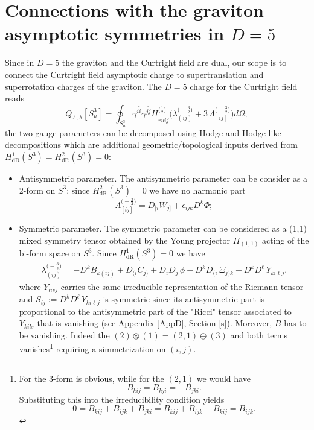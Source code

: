 \documentclass[a4paper,12pt]{article}
\begin{document}
\section{Connections with the graviton asymptotic symmetries in $D=5$}\label{sec4}
Since in $D=5$ the graviton and the Curtright field are dual, our scope is to connect the Curtright field asymptotic charge to supertranslation and superrotation charges of the graviton. The $D=5$ charge for the Curtright field reads
\begin{equation}
    Q_{\Lambda, \lambda}[S^{3}_u]= \oint_{S^{3}_u}\gamma^{i\tilde{i}}\gamma^{j\tilde{j}}H^{\big(\frac{1}{2}\big)}_{r u \tilde{i} \tilde{j}}\bigg(\lambda^{\big(-\frac{3}{2}\big)}_{(i j)}+3\,\Lambda^{\big(-\frac{3}{2}\big)}_{[i j]}\bigg)d\Omega;
    \label{chargefinD5}
\end{equation}
the two gauge parameters can be decomposed using Hodge and Hodge-like decompositions which are additional geometric/topological inputs derived from $H^1_{\text{dR}}(S^3)=H^2_{\text{dR}}(S^3)=0$:
\begin{itemize}
 \item Antisymmetric parameter. The antisymmetric parameter can be consider as a 2-form on $S^3$; since $H^2_{\text{dR}}(S^3)=0$ we have no harmonic part
     \begin{equation}
        \Lambda_{[ij]}^{\big(-\frac{3}{2}\big)} = D_{[i} W_{j]}+\epsilon_{ijk}D^k\Phi;
    \end{equation}
    \item Symmetric parameter. The symmetric parameter can be considered as a (1,1) mixed symmetry tensor obtained by the Young projector $\Pi_{(1,1)}$ acting of the bi-form space on $S^3$. Since $H^1_{\text{dR}}(S^3)=0$ we have
\begin{equation}\label{eq:decomp-sym2}
\begin{aligned}
  \lambda^{\big(-\frac{3}{2}\big)}_{(ij)} 
=
-D^{k} B_{k(ij)}
+D_{(i} C_{j)}
+D_{i}D_{j}\,\phi 
-D^{k}D_{(i}\,\Xi_{j)k}
+D^{k}D^{\ell}\,Y_{k i \ell j} .
\end{aligned}
\end{equation}
    where $Y_{lisj}$ carries the same irreducible representation of the Riemann tensor and $S_{ij}:=D^{k}D^{\ell}\,Y_{k i \ell j}$ is symmetric since its antisymmetric part is proportional to the antisymmetric part of the "Ricci" tensor associated to $Y_{kils}$ that is vanishing (see Appendix \ref{AppD}, Section \ref{s}). Moreover, $B$ has to be vanishing. Indeed the $(2) \otimes (1) = (2,1) \oplus (3)$ and both terms vanishes\footnote{For the 3-form is obvious, while for the $(2,1)$ we would have 
\begin{equation*}\label{eq:B-step1}
B_{kij}=B_{kji}=-B_{jki}.
\end{equation*}
Substituting this into the irreducibility condition yields
\begin{equation*}\label{eq:B-step2}
0=B_{kij}+B_{ijk}+B_{jki}
= B_{kij}+B_{ijk}-B_{kij}
= B_{ijk}.
\end{equation*}} requiring a simmetrization on $(i,j)$. 
\end{itemize}
\end{document}
